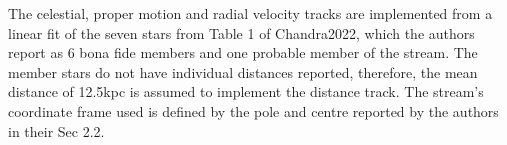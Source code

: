 The celestial, proper motion and radial velocity tracks are implemented from a linear fit of the seven stars from Table 1 of Chandra2022, which the authors report as 6 bona fide members and one probable member of the stream. The member stars do not have individual distances reported, therefore, the mean distance of 12.5kpc is assumed to implement the distance track. The stream's coordinate frame used is defined by the pole and centre reported by the authors in their Sec 2.2.
